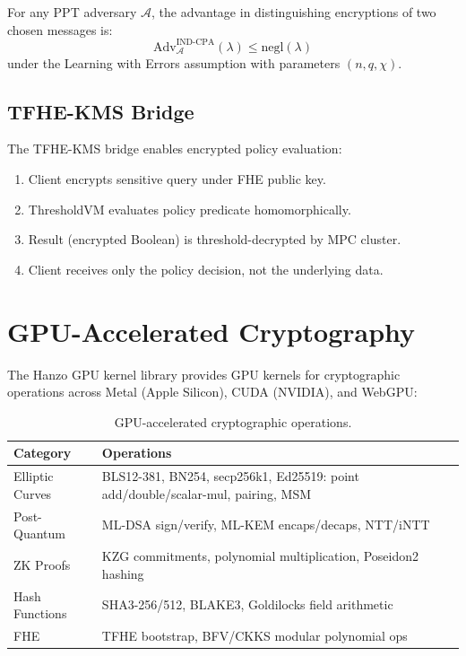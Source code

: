 \documentclass[11pt,letterpaper]{article}
\begin{document}
\begin{definition}
For any PPT adversary $\mathcal{A}$, the advantage in distinguishing encryptions of two chosen messages is:
\[
\text{Adv}_{\mathcal{A}}^{\text{IND-CPA}}(\lambda) \leq \text{negl}(\lambda)
\]
under the Learning with Errors assumption with parameters $(n, q, \chi)$.
\end{definition}

\subsection{TFHE-KMS Bridge}

The TFHE-KMS bridge enables encrypted policy evaluation:
\begin{enumerate}
\item Client encrypts sensitive query under FHE public key.
\item ThresholdVM evaluates policy predicate homomorphically.
\item Result (encrypted Boolean) is threshold-decrypted by MPC cluster.
\item Client receives only the policy decision, not the underlying data.
\end{enumerate}

\section{GPU-Accelerated Cryptography}

The Hanzo GPU kernel library provides GPU kernels for cryptographic operations across Metal (Apple Silicon), CUDA (NVIDIA), and WebGPU:

\begin{table}[H]
\centering
\begin{tabular}{@{}lp{6cm}@{}}
\toprule
\textbf{Category} & \textbf{Operations} \\
\midrule
Elliptic Curves & BLS12-381, BN254, secp256k1, Ed25519: point add/double/scalar-mul, pairing, MSM \\
Post-Quantum & ML-DSA sign/verify, ML-KEM encaps/decaps, NTT/iNTT \\
ZK Proofs & KZG commitments, polynomial multiplication, Poseidon2 hashing \\
Hash Functions & SHA3-256/512, BLAKE3, Goldilocks field arithmetic \\
FHE & TFHE bootstrap, BFV/CKKS modular polynomial ops \\
\bottomrule
\end{tabular}
\caption{GPU-accelerated cryptographic operations.}
\label{tab:gpu-crypto}
\end{table}
\end{document}
